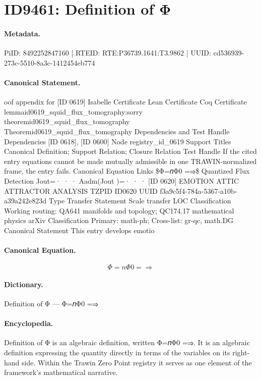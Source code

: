 \section*{ID9461: Definition of Φ}
\paragraph{Metadata.}
PiID: 8492252847160 | RTEID: RTE:P36739.1641:T3.9862 | UUID: cd536939-273c-5510-8a3c-1412454eb774

\paragraph{Canonical Statement.}
oof appendix for [ID 0619] Isabelle Certificate Lean Certificate Coq Certificate lemmaid0619\_squid\_flux\_tomography:sorry theoremid0619\_squid\_flux\_tomography Theoremid0619\_squid\_flux\_tomography Dependencies and Test Handle Dependencies [ID 0618], [ID 0600] Node registry\_id\_0619 Support Titles Canonical Definition; Support Relation; Closure Relation Test Handle If the cited entry equations cannot be made mutually admissible in one TRAWIN-normalized frame, the entry fails. Canonical Equation Links \$Φ=𝑛Φ0 =⇒\$ Quantized Flux Detection Jout=· · · Aadm(Jout )=· · · [ID 0620] EMOTION ATTIC ATTRACTOR ANALYSIS TZPID ID0620 UUID f3a9c5f4-784a-5367-a10b-a39a242e823d Type Transfer Statement Scale transfer LOC Classification Working routing: QA641 manifolds and topology; QC174.17 mathematical physics arXiv Classification Primary: math-ph; Cross-list: gr-qc, math.DG Canonical Statement This entry develops emotio

\paragraph{Canonical Equation.}
\[
Φ=𝑛Φ0 =⇒
\]

\paragraph{Dictionary.}
Definition of Φ — Φ=𝑛Φ0 =⇒

\paragraph{Encyclopedia.}
Definition of Φ is an algebraic definition, written Φ=𝑛Φ0 =⇒. It is an algebraic definition expressing the quantity directly in terms of the variables on its right-hand side. Within the Trawin Zero Point registry it serves as one element of the framework's mathematical narrative.
